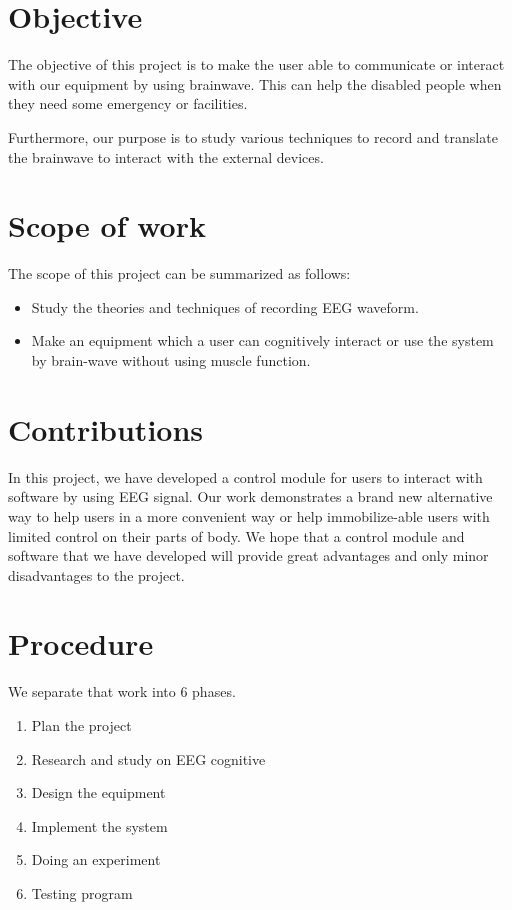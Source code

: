 \section{Objective}
\hspace{1.5cm} The objective of this project is to make the user able to communicate or interact with our equipment by using brainwave. This can help the disabled people when they need some emergency or facilities. \par
Furthermore, our purpose is to study various techniques to record and translate the brainwave to interact with the external devices. 

\section{Scope of work}

The scope of this project can be summarized as follows:
\begin{itemize}
\vspace{-1cm}
	\item Study the theories and techniques of recording EEG waveform.
\vspace{-1cm}
    \item Make an equipment which a user can cognitively interact or use the system by brain-wave without using muscle function.
\end{itemize}  

\section{Contributions}
\hspace{1.5cm} In this project, we have developed a control module for users to interact with software by using EEG signal. Our work demonstrates a brand new alternative way to help users in a more convenient way or help immobilize-able users with limited control on their parts of body. We hope that a control module and software that we have developed will provide great advantages and only minor disadvantages to the project.

\section{Procedure}
We separate that work into 6 phases. 
\begin{enumerate}
\vspace{-0.5cm}
\item Plan the project 
\vspace{-0.25cm}
\item Research and study on EEG cognitive 
\vspace{-0.25cm}
\item Design the equipment 
\vspace{-0.25cm}
\item Implement the system 
\vspace{-0.25cm}
\item Doing an experiment 
\vspace{-0.25cm}
\item Testing program
\end{enumerate}


